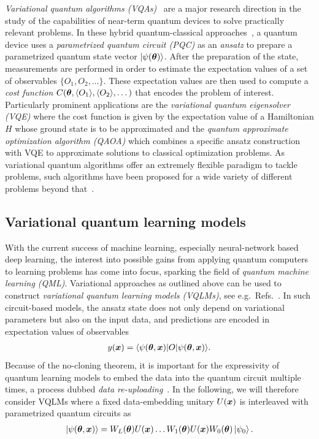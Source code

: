 \documentclass[a4paper,twocolumn,notitlepage,nofootinbib,superscriptaddress,floatfix]{revtex4-2}
\begin{document}
\emph{Variational quantum algorithms (VQAs)}~\cite{cerezo2021variational} are a major research direction in the study of the capabilities of near-term quantum devices to solve practically relevant problems. In these hybrid quantum-classical approaches~\cite{mcclean2016theory}, a quantum device uses a \emph{parametrized quantum circuit (PQC)} as an \emph{ansatz} to prepare a parametrized quantum state vector $\ket{\psi(\boldsymbol{\theta})}$. After the preparation of the state, measurements are performed in order to estimate the expectation values of a set of observables $\{ O_1, O_2, \dots \}$. These expectation values are then used to compute a \emph{cost function} $C(\boldsymbol{\theta}, \langle O_1 \rangle, \langle O_2 \rangle, \dots )$ that encodes the problem of interest. Particularly prominent applications are the \emph{variational quantum eigensolver (VQE)} where the cost function is given by the expectation value of a Hamiltonian $H$ whose ground state is to be approximated and the \emph{quantum approximate optimization algorithm (QAOA)} which combines a specific ansatz construction with VQE to approximate solutions to classical optimization problems. As variational quantum algorithms offer an extremely flexible paradigm to tackle problems, such algorithms have been proposed for a wide variety of different problems beyond that~\cite{BhartiDoi}.

\subsection*{Variational quantum learning models}
With the current success of machine learning, especially neural-network based deep learning, the interest into possible gains from applying quantum computers to learning problems has come into focus, sparking the field of \emph{quantum machine learning (QML)}. Variational approaches as outlined above can be used to construct \emph{variational quantum learning models (VQLMs)}, see e.g.\ Refs.~\cite{mitarai2018quantum,benedetti2019parameterized,schuld2020circuit-centric}. In such circuit-based models, the ansatz state does not only depend on variational parameters but also on the input data, and predictions are encoded in expectation values of observables
\begin{align}
    y(\boldsymbol{x}) =\langle{\psi(\ensuremath{\boldsymbol{\theta}}, \ensuremath{\boldsymbol{x}})} | O | {\psi(\boldsymbol{\theta}, \boldsymbol{x})} \rangle.
\end{align}
Because of the no-cloning theorem, it is important for the expressivity of quantum learning models to embed the data into the quantum circuit multiple times, a process dubbed \emph{data re-uploading}~\cite{perez-salinas2020data,schuld2021effect,jerbi2022quantum}. In the following, we will therefore consider VQLMs where a fixed data-embedding unitary $U(\boldsymbol{x})$ is interleaved with parametrized quantum circuits as
\begin{align}\label{eqn:re-uploading-model}
    \ket{\psi(\boldsymbol{\theta}, \boldsymbol{x})} =  W_L(\boldsymbol{\theta}) U(\boldsymbol{x}) \dots W_1(\boldsymbol{\theta}) U(\boldsymbol{x}) W_0(\boldsymbol{\theta}) \ket{\psi_0}.
\end{align}
\end{document}
